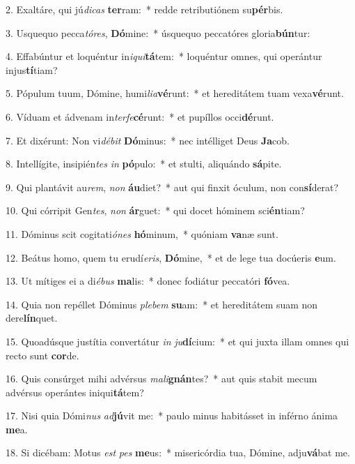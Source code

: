 2. Exaltáre, qui jú\textit{di}\textit{cas} \textbf{ter}ram:~*  redde retributiónem su\textbf{pér}bis.\

3. Usquequo pecca\textit{tó}\textit{res}, \textbf{Dó}mine:~*  úsquequo peccatóres gloria\textbf{bún}tur:\

4. Effabúntur et loquéntur in\textit{i}\textit{qui}\textbf{tá}tem:~*  loquéntur omnes, qui operántur injus\textbf{tí}tiam?\

5. Pópulum tuum, Dómine, humi\textit{li}\textit{a}\textbf{vé}runt:~*  et hereditátem tuam vexa\textbf{vé}runt.\

6. Víduam et ádvenam in\textit{ter}\textit{fe}\textbf{cé}runt:~*  et pupíllos occi\textbf{dé}runt.\

7. Et dixérunt: Non vi\textit{dé}\textit{bit} \textbf{Dó}minus:~*  nec intélliget Deus \textbf{Ja}cob.\

8. Intellígite, insipién\textit{tes} \textit{in} \textbf{pó}pulo:~*  et stulti, aliquándo \textbf{sá}pite.\

9. Qui plantávit au\textit{rem}, \textit{non} \textbf{áu}diet?~*  aut qui finxit óculum, non con\textbf{sí}derat?\

10. Qui córripit Gen\textit{tes}, \textit{non} \textbf{ár}guet:~*  qui docet hóminem sci\textbf{én}tiam?\

11. Dóminus scit cogitati\textit{ó}\textit{nes} \textbf{hó}minum,~*  quóniam \textbf{va}næ sunt.\

12. Beátus homo, quem tu erudí\textit{e}\textit{ris}, \textbf{Dó}mine,~*  et de lege tua docúeris \textbf{e}um.\

13. Ut mítiges ei a di\textit{é}\textit{bus} \textbf{ma}lis:~*  donec fodiátur peccatóri \textbf{fó}vea.\

14. Quia non repéllet Dóminus \textit{ple}\textit{bem} \textbf{su}am:~*  et hereditátem suam non dere\textbf{lín}quet.\

15. Quoadúsque justítia convertátur \textit{in} \textit{ju}\textbf{dí}cium:~*  et qui juxta illam omnes qui recto sunt \textbf{cor}de.\

16. Quis consúrget mihi advérsus \textit{ma}\textit{li}\textbf{gnán}tes?~*  aut quis stabit mecum advérsus operántes iniqui\textbf{tá}tem?\

17. Nisi quia Dómi\textit{nus} \textit{ad}\textbf{jú}vit me:~*  paulo minus habitásset in inférno ánima \textbf{me}a.\

18. Si dicébam: Motus \textit{est} \textit{pes} \textbf{me}us:~*  misericórdia tua, Dómine, adju\textbf{vá}bat me.\

